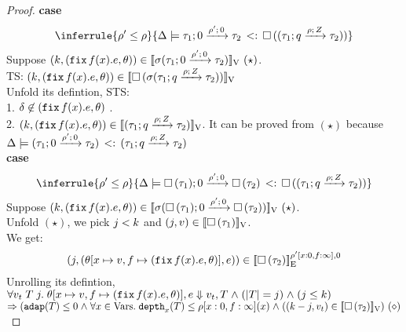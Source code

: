 \begin{proof}

\textbf{case}
\[
 \inferrule{
\dmap' \leq \dmap
    }{
       \Delta \models \sub{\tarr{\type_1}{\type_2}{0}{\dmap'}{0} }{  \tbox{(
          \tarr{\type_1}{\type_2}{\nnatbiA}{\dmap}{\nnatA} )  }
    } }
\]
Suppose  $ (\stepiA, (\efix f(x).\expr, \env) ) \in \lrv{\ienv (\tarr{\type_1}{\type_2}{0}{\dmap'}{0})  } ~(\star)$.\\
TS: $ (\stepiA, (\efix f(x).\expr, \env) ) \in \lrv{ \tbox{\ienv (\tarr{\type_1}{\type_2}{\nnatbiA}{\dmap}{\nnatA})  } } $ \\
Unfold its defintion, STS:\\
1. $ \delta \not \in  (\efix f(x).\expr, \env)$ .  \\
2.  $(\stepiA, (\efix f(x).\expr, \env) ) \in  \lrv{(\tarr{\type_1}{\type_2}{\nnatbiA}{\dmap}{\nnatA})}
$.  It can be proved from $(\star)$ because $ \Delta \models \sub{
  (\tarr{\type_1}{\type_2}{0}{\dmap'}{0})} {
  (\tarr{\type_1}{\type_2}{\nnatbiA}{\dmap}{\nnatA}) }  $ \\

\textbf{case}
\[
 \inferrule{
\dmap' \leq \dmap
    }{
       \Delta \models \sub{\tarr{\tbox{\type_1}}{\tbox{\type_2}}{0}{\dmap'}{0} }{  \tbox{(
          \tarr{\type_1}{\type_2}{\nnatbiA}{\dmap}{\nnatA} )  }
    } }
\]
Suppose  $ (\stepiA, (\efix f(x).\expr, \env) ) \in \lrv{\ienv
  (\tarr{\tbox{\type_1}}{\tbox{\type_2}}{0}{\dmap'}{0})  }
~(\star)$.\\
Unfold $(\star)$, we pick $\stepiB < \stepiA$ and $(\stepiB, \valr)
\in \lrv{\tbox{\type_1}}$. \\
We get:
 \[
   (\stepiB, (\env[x \mapsto \valr, f \mapsto (\efix f(x).\expr, \env)], \expr)) \in \lre{\dmap'[x: 0, f: \infty]}{0}{\tbox{\type_2}}
\]
Unrolling its defintion,\\
$ \forall \valr_t \eapp  \tr\eapp  \stepiB.\eapp \env[x \mapsto \valr, f \mapsto (\efix f(x).\expr, \env)], \expr \bigstep \valr_t, \tr  \conj (\size{\tr} = \stepiB) \conj (\stepiB \leq \stepiA)$\\
$\Rightarrow (\adap(\tr) \leq 0 \conj \forall x \in \mbox{Vars}.\eapp
\ddep{x}(\tr) \leq \dmap[x:0, f: \infty](x) \conj ((\stepiA - \stepiB,
\valr_t) \in \lrv{\tbox{ \type_2} })~(\diamond)$\\


\end{proof}
